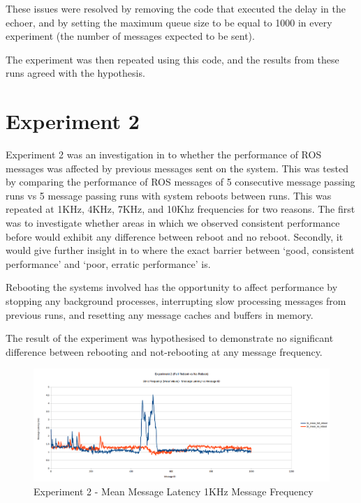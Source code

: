 \documentclass{l4proj}
\begin{document}
These issues were resolved by removing the code that executed the delay in the echoer, and by setting the maximum queue size to be equal to 1000 in every experiment (the number of messages expected to be sent).

The experiment was then repeated using this code, and the results from these runs agreed with the hypothesis.

\chapter{Experiment 2}

Experiment 2 was an investigation in to whether the performance of ROS messages was affected by previous messages sent on the system. This was tested by comparing the performance of ROS messages of 5 consecutive message passing runs vs 5 message passing runs with system reboots between runs. This was repeated at 1KHz, 4KHz, 7KHz, and 10Khz frequencies for two reasons. The first was to investigate whether areas in which we observed consistent performance before would exhibit any difference between reboot and no reboot. Secondly, it would give further insight in to where the exact barrier between `good, consistent performance' and `poor, erratic performance' is.

Rebooting the systems involved has the opportunity to affect performance by stopping any background processes, interrupting slow processing messages from previous runs, and resetting any message caches and buffers in memory.

The result of the experiment was hypothesised to demonstrate no significant difference between rebooting and not-rebooting at any message frequency.

\begin{figure}[h]
\centering
\includegraphics[width=\textwidth]{images/1khz-mean.png}
\caption{Experiment 2 - Mean Message Latency 1KHz Message Frequency}
\label{exp2-1khz-mean}
\end{figure}
\end{document}
